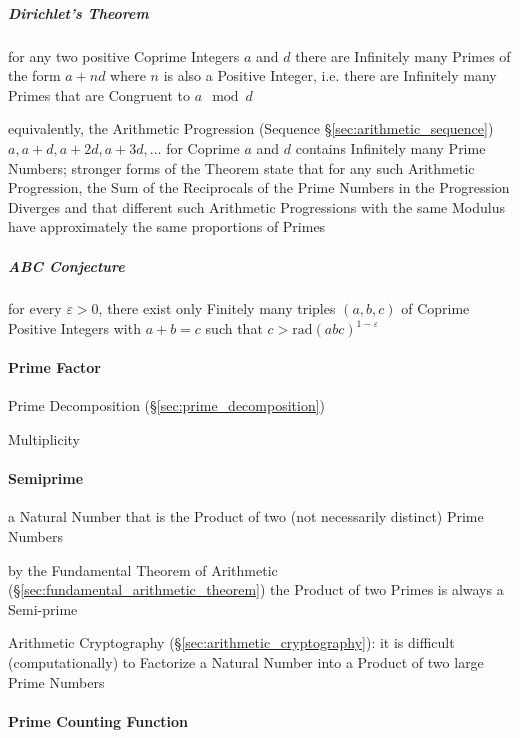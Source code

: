 \subparagraph{Dirichlet's Theorem}\label{sec:dirichlets_theorem}\hfill

for any two positive Coprime Integers $a$ and $d$ there are Infinitely many
Primes of the form $a + nd$ where $n$ is also a Positive Integer, i.e. there are
Infinitely many Primes that are Congruent to $a \mod d$

equivalently, the Arithmetic Progression (Sequence
\S\ref{sec:arithmetic_sequence}) $a, a + d, a + 2d, a + 3d, \ldots$ for Coprime
$a$ and $d$ contains Infinitely many Prime Numbers; stronger forms of the
Theorem state that for any such Arithmetic Progression, the Sum of the
Reciprocals of the Prime Numbers in the Progression Diverges and that different
such Arithmetic Progressions with the same Modulus have approximately the same
proportions of Primes



\subparagraph{ABC Conjecture}\label{sec:abc_conjecture}\hfill

for every $\varepsilon > 0$, there exist only Finitely many triples $(a,b,c)$ of
Coprime Positive Integers with $a + b = c$ such that
$c > \mathrm{rad}(abc)^{1-\varepsilon}$



\paragraph{Prime Factor}\label{sec:prime_factor}\hfill

Prime Decomposition (\S\ref{sec:prime_decomposition})

Multiplicity



\paragraph{Semiprime}\label{sec:semiprime}\hfill

a Natural Number that is the Product of two (not necessarily distinct) Prime
Numbers

by the Fundamental Theorem of Arithmetic
(\S\ref{sec:fundamental_arithmetic_theorem}) the Product of two Primes is
always a Semi-prime

\fist Arithmetic Cryptography (\S\ref{sec:arithmetic_cryptography}): it is
difficult (computationally) to Factorize a Natural Number into a Product of two
large Prime Numbers



\paragraph{Prime Counting Function}\label{sec:prime_counting}\hfill

